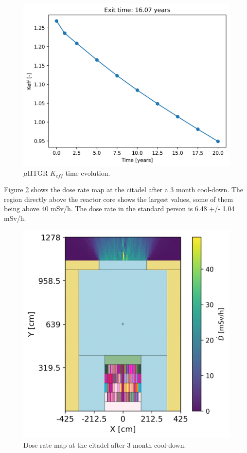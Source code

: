 \begin{figure}[htbp!]
  \begin{center}
    \includegraphics[width=0.55\linewidth]{figures/keff-irrad-time}
  \end{center}
  \caption{$\mu$HTGR $K_{eff}$ time evolution.}
  \label{fig:res-1}
\end{figure}

Figure \ref{fig:res-2} shows the dose rate map at the citadel after a 3 month cool-down.
The region directly above the reactor core shows the largest values, some of them being above 40 mSv/h.
The dose rate in the standard person is 6.48 +/- 1.04 mSv/h.

\begin{figure}[htbp!]
  \begin{center}
    \includegraphics[width=0.60\linewidth]{figures/meshtal4}
  \end{center}
  \caption{Dose rate map at the citadel after 3 month cool-down.}
  \label{fig:res-2}
\end{figure}

